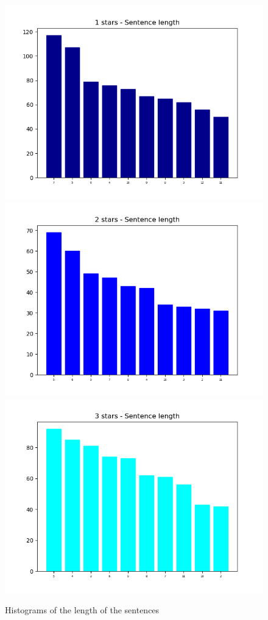 	\begin{figure}
		\caption{Histograms of the length of the sentences}
		\includegraphics[scale=0.3]{figures/1stars-Sentencelength.png}
		\includegraphics[scale=0.3]{figures/2stars-Sentencelength.png}
		\includegraphics[scale=0.3]{figures/3stars-Sentencelength.png}

\end{figure}
